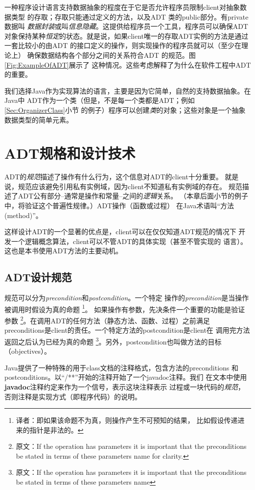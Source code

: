 一种程序设计语言支持数据抽象的程度在于它是否允许程序员限制client对抽象数据类型
的存取；存取只能通过定义的方法，以及ADT 类的public部分。有private数据叫
\emph{数据封装}或叫\emph{信息隐藏}。这提供给程序员一个工具，程序员可以确保ADT
对象保持某种\emph{恒定}的状态。就是说，如果client唯一的存取ADT实例的方法是通过
一套比较小的由ADT 的接口定义的操作，则实现操作的程序员就可以（至少在理论上）
确保数据结构各个部分之间的关系符合ADT 的规范。图\ref{Fig:ExampleOfADT}展示了
这种情况。这些考虑解释了为什么在软件工程中ADT的重要。

我们选择Java作为实现算法的语言，主要是因为它简单，自然的支持数据抽象。在Java中
ADT作为一个类（但是，不是每一个类都是ADT；例如\ref{Sec:OrganizerClass}小节
的例子）程序可以创建\emph{类}的对象；这些对象是一个抽象数据类型的简单元素。

\section{ADT规格和设计技术}
ADT的\emph{规范}描述了操作有什么行为，这个信息对ADT的client十分重要。
就是说，规范应该避免引用私有实例域，因为client不知道私有实例域的存在。
规范描述了ADT公有部分--通常是操作和常量--之间的\emph{逻辑}关系。
（本章后面小节的例子中，将验证这个普遍性规律。）ADT操作（函数或过程）
在Java术语叫“方法(method)”。

这样设计ADT的一个显著的优点是，client可以在仅仅知道ADT规范的情况下
开发一个逻辑概念算法，client可以不管ADT的具体实现（甚至不管实现的
语言）。这也是本书使用ADT方法的主要动机。

\subsection{ADT设计规范}\label{Sec:ADTSpecification}
规范可以分为\emph{precondition}和\emph{postcondition}。一个特定
操作的\emph{precondition}是当操作被调用时假设为真的命题
\footnote{译者：即如果该命题不为真，则操作产生不可预知的结果，
比如假设传递进来的指针是非法的。}。
如果操作有参数，先决条件一个重要的功能是验证参数
\footnote{原文：If the operation has parameters it is important that
the preconditions be stated in terms of these parameters name for
clarity.}。在调用ADT的任何方法（静态方法、函数、过程）之前满足
preconditions是client的责任。一个特定方法的postcondition是client在
调用完方法返回之后认为已经为真的命题 \footnote{原文：If the operation
has parameters it is important that the preconditions be stated in
terms of these parameters
name}。另外，postcondition也叫做方法的目标（objectives）。

Java提供了一种特殊的用于class文档的注释格式，包含方法的preconditions
和postconditions。以“/**”开始的注释开始了一个javadoc注释。我们
在文本中使用\textbf{javadoc}注释约定来作为一个信号，表示这块注释表示
过程或一块代码的\emph{规范}，否则注释是实现方式（即程序代码）的说明。

